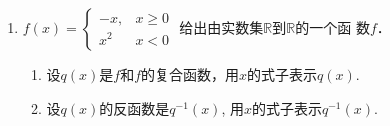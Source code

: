 \begin{enumerate}
\item $f(x)=\begin{cases}
    -x,& x\ge 0\\ x^2& x<0
\end{cases}$
给出由实数集$\mathbb{R}$到$\mathbb{R}$的一个函
数$f$．
\begin{enumerate}
    \item 设$q(x)$是$f$和$f$的复合函数，用$x$的式子表示$q(x)$.
    \item 设$q(x)$的反函数是$q^{-1}(x)$, 用$x$的式子表示$q^{-1}(x)$.
\end{enumerate}
\end{enumerate}






